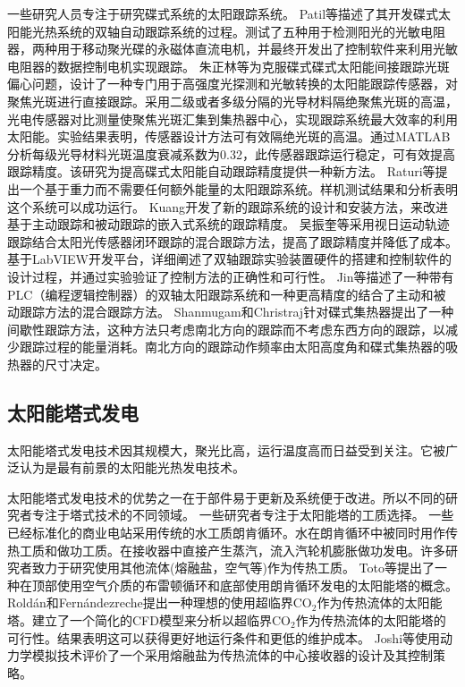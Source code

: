 一些研究人员专注于研究碟式系统的太阳跟踪系统。
Patil等\cite{Patil2016}描述了其开发碟式太阳能光热系统的双轴自动跟踪系统的过程。测试了五种用于检测阳光的光敏电阻器，两种用于移动聚光碟的永磁体直流电机，并最终开发出了控制软件来利用光敏电阻器的数据控制电机实现跟踪。
朱正林等\cite{Zhu2016}为克服碟式碟式太阳能间接跟踪光斑偏心问题，设计了一种专门用于高强度光探测和光敏转换的太阳能跟踪传感器，对聚焦光斑进行直接跟踪。采用二级或者多级分隔的光导材料隔绝聚焦光斑的高温，光电传感器对比测量使聚焦光斑汇集到集热器中心，实现跟踪系统最大效率的利用太阳能。实验结果表明，传感器设计方法可有效隔绝光斑的高温。通过MATLAB分析每级光导材料光斑温度衰减系数为0.32，此传感器跟踪运行稳定，可有效提高跟踪精度。该研究为提高碟式太阳能自动跟踪精度提供一种新方法。
Raturi等\cite{Raturi2014}提出一个基于重力而不需要任何额外能量的太阳跟踪系统。样机测试结果和分析表明这个系统可以成功运行。
Kuang\cite{Kuang2012}开发了新的跟踪系统的设计和安装方法，来改进基于主动跟踪和被动跟踪的嵌入式系统的跟踪精度。
吴振奎等\cite{Wu2015}采用视日运动轨迹跟踪结合太阳光传感器闭环跟踪的混合跟踪方法，提高了跟踪精度并降低了成本。基于LabVIEW开发平台，详细阐述了双轴跟踪实验装置硬件的搭建和控制软件的设计过程，并通过实验验证了控制方法的正确性和可行性。
Jin等\cite{Jin2013}描述了一种带有PLC（编程逻辑控制器）的双轴太阳跟踪系统和一种更高精度的结合了主动和被动跟踪方法的混合跟踪方法。
Shanmugam和Christraj\cite{Shanmugam2005}针对碟式集热器提出了一种间歇性跟踪方法，这种方法只考虑南北方向的跟踪而不考虑东西方向的跟踪，以减少跟踪过程的能量消耗。南北方向的跟踪动作频率由太阳高度角和碟式集热器的吸热器的尺寸决定。

\subsection{太阳能塔式发电}
\label{sec:st}

太阳能塔式发电技术因其规模大，聚光比高，运行温度高而日益受到关注。它被广泛认为是最有前景的太阳能光热发电技术。

太阳能塔式发电技术的优势之一在于部件易于更新及系统便于改进。所以不同的研究者专注于塔式技术的不同领域。
一些研究者专注于太阳能塔的工质选择。
一些已经标准化的商业电站采用传统的水工质朗肯循环\cite{Spiros2017}。水在朗肯循环中被同时用作传热工质和做功工质。在接收器中直接产生蒸汽，流入汽轮机膨胀做功发电\cite{Montes2009,Feldhoff2012,Steinmann2006,Yu2017,Gonzalez2017}。许多研究者致力于研究使用其他流体(熔融盐，空气等)作为传热工质。
Toto等\cite{Toro2016}提出了一种在顶部使用空气介质的布雷顿循环和底部使用朗肯循环发电的太阳能塔的概念。
Rold\'{a}n和Fern\'{a}ndezreche\cite{Rold2016}提出一种理想的使用超临界CO$_2$作为传热流体的太阳能塔。建立了一个简化的CFD模型来分析以超临界CO$_2$作为传热流体的太阳能塔的可行性。结果表明这可以获得更好地运行条件和更低的维护成本。
Joshi等\cite{Joshi2016}使用动力学模拟技术评价了一个采用熔融盐为传热流体的中心接收器的设计及其控制策略。

